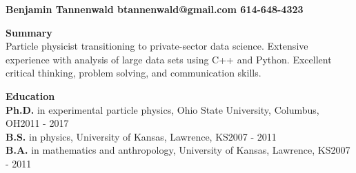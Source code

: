 \documentclass[line]{letter}
\newenvironment{list1}{
  \begin{list}{\ding{113}}{%
      \setlength{\itemsep}{0in}
      \setlength{\parsep}{0in} \setlength{\parskip}{0in}
      \setlength{\topsep}{0in} \setlength{\partopsep}{0in} 
      \setlength{\leftmargin}{0.17in}}}{\end{list}}
\begin{document}
{\bf \Large Benjamin Tannenwald \large \hspace{20mm}btannenwald@gmail.com \hfill 614-648-4323\vspace*{.05in}}
\\\noindent{\rule{\textwidth}{1.5pt}}

\vspace{.1in}
{\Large \bf Summary\vspace{5pt}\\}
Particle physicist transitioning to private-sector data science. Extensive experience with analysis of large data
sets using C++ and Python. Excellent critical thinking, problem solving, and communication skills.

{\vspace{10pt}\Large \bf Education\vspace{7pt}\\}
{\bf  Ph.D.} in experimental particle physics, Ohio State University, Columbus, OH\hfill 2011 - 2017\\
{\bf B.S.} in physics, University of Kansas, Lawrence, KS\hfill 2007 - 2011\\
{\bf B.A.} in mathematics and anthropology,  University of Kansas, Lawrence, KS\hfill 2007 - 2011
\end{document}
